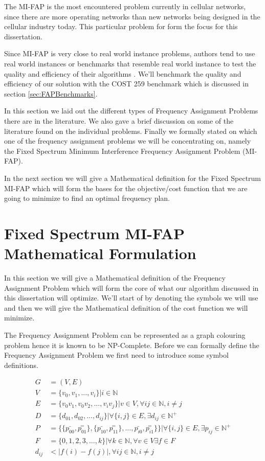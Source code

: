 The MI-FAP is the most encountered problem currently in cellular networks, since there are more operating networks than new networks being designed in the cellular industry today. This particular problem for form the focus for this dissertation. 

Since MI-FAP is very close to real world instance problems, authors tend to use real world instances or benchmarks that resemble real world instance to test the quality and efficiency of their algorithms \cite{Karen2004,Eisenblatter,MontemanniThesis,MultipleBinaryFAP}. We'll benchmark the quality and efficiency of our solution with the COST 259 benchmark which is discussed in section \ref{sec:FAPBenchmarks}.

In this section we laid out the different types of Frequency Assignment Problems there are in the literature. We also gave a brief discussion on some of the literature found on the individual problems. Finally we formally stated on which one of the frequency assignment problems we will be concentrating on, namely the Fixed Spectrum Minimum Interference Frequency Assignment Problem (MI-FAP). 

In the next section we will give a Mathematical definition for the Fixed Spectrum MI-FAP which will form the bases for the objective/cost function that we are going to minimize to find an optimal frequency plan.
\section{Fixed Spectrum MI-FAP Mathematical Formulation}
In this section we will give a Mathematical definition of the Frequency Assignment Problem which will form the core of what our algorithm discussed in this dissertation will optimize. We'll start of by denoting the symbols we will use and then we will give the Mathematical definition of the cost function we will minimize.

The Frequency Assignment Problem can be represented as a graph colouring problem hence it is known to be NP-Complete. Before we can formally define the Frequency Assignment Problem we first need to introduce some symbol definitions.

\begin{align}
	G &= (V,E) \label{E:setG}\\
	V &= \{v_{0},v_{1},...,v_{i}\} | i \in \mathbb{N} \label{E:setV}\\
	E &= \{v_0v_1,v_0v_2,...,v_iv_j\}|v \in V,\forall ij \in \mathbb{N},i \neq j \label{E:setE}\\
	D &= \{d_{01},d_{02},...,d_{ij}\}| \forall\{i,j\} \in E, \exists d_{ij} \in \mathbb{N}^+ \label{E:setD}\\
	P &= \{\{\bar{p_{00}},\overset{=}{p_{01}}\},\{\bar{p_{10}},\overset{=}{p_{11}}\},\ldots,\bar{p_{i0}},\overset{=}{p_{i1}}\}\}| \forall \{i,j\} \in E,\exists p_{ij} \in \mathbb{N}^+ \label{E:setP}\\
	F &= \{0,1,2,3,...,k\}| \forall k \in \mathbb{N},\forall v \in V \exists f \in F\label{E:setF}\\
	d_{ij} &< |f(i) - f(j)|, \forall ij \in \mathbb{N},i \neq j \label{E:interference}
\end{align}

